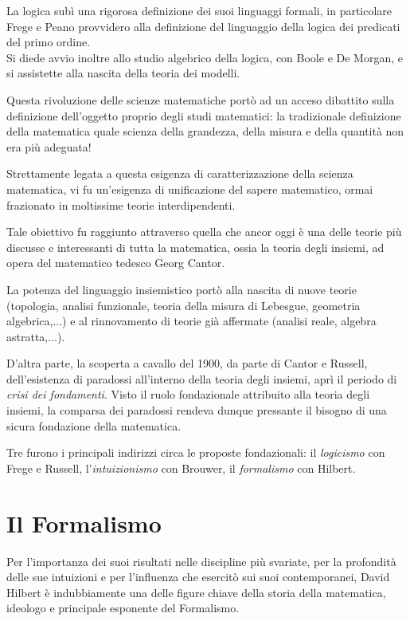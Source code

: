 La logica subì una rigorosa definizione dei suoi linguaggi formali, in particolare Frege e Peano provvidero alla definizione del linguaggio della logica dei predicati del primo ordine.\\
Si diede avvio inoltre allo studio algebrico della logica, con Boole e De Morgan, e si assistette alla nascita della teoria dei modelli.

Questa rivoluzione delle scienze matematiche portò ad un acceso dibattito sulla definizione dell'oggetto proprio degli studi matematici: la tradizionale definizione della matematica quale scienza della grandezza, della misura e della quantità non era più adeguata!

Strettamente legata a questa esigenza di caratterizzazione della scienza ma\-te\-ma\-ti\-ca, vi fu un'esigenza di unificazione del sapere matematico, ormai fra\-zio\-na\-to in moltissime teorie interdipendenti.

Tale obiettivo fu raggiunto attraverso quella che ancor oggi è una delle teorie più discusse e interessanti di tutta la matematica, ossia la teoria degli insiemi, ad opera del matematico tedesco Georg Cantor.

La potenza del linguaggio insiemistico portò alla nascita di nuove teorie (topologia, analisi funzionale, teoria della misura di Lebesgue, geometria algebrica,...) e al rinnovamento di teorie già affermate (analisi reale, algebra astratta,...).

D'altra parte, la scoperta a cavallo del 1900, da parte di Cantor e Russell, dell'esistenza di paradossi all'interno della teoria degli insiemi, aprì il periodo di \emph{crisi dei fondamenti}.
Visto il ruolo fondazionale attribuito alla teoria degli insiemi, la comparsa dei paradossi rendeva dunque pressante il bisogno di una sicura fondazione della matematica.

Tre furono i principali indirizzi circa le proposte fondazionali: il \emph{logicismo} con Frege e Russell, l'\emph{intuizionismo} con Brouwer, il \emph{formalismo} con Hilbert.\\
\bigskip


\section{Il Formalismo}

Per l'importanza dei suoi risultati nelle discipline più svariate, per la profondità delle sue intuizioni e per l'influenza che esercitò sui suoi contemporanei, David Hilbert è indubbiamente una delle figure chiave della storia della matematica, ideologo e principale esponente del Formalismo.

